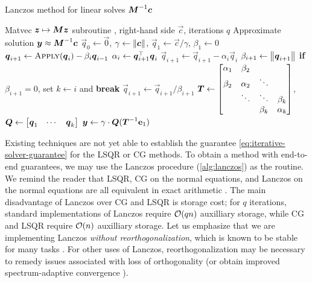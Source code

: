 \documentclass[onefignum,onetabnum,pagebackref,dvipsnames]{siamart220329}
\begin{document}
\begin{algorithm}[t]
	\caption{Lanczos method for linear solves $\mat{M}^{-1}\vec{c}$} \label{alg:lanczos}
	\begin{algorithmic}[1]
		\Require Matvec $\vec{z} \mapsto \mat{M}\vec{z}$ subroutine , right-hand side $\vec{c}$, iterations $q$
		\Ensure Approximate solution $\vec{y} \approx \mat{M}^{-1}\vec{c}$
		\State $\vec{q}_0 \gets \vec{0}$, $\gamma \gets \norm{\vec{c}}$, $\vec{q}_1\gets \vec{c}/\gamma$, $\beta_1 \gets 0$
        \State $\vec{q}_{i+1} \gets \Call{Apply}{\vec{q}_i} - \beta_i \vec{q}_{i-1}$
        \State $\alpha_i \gets \vec{q}_{i+1}^\top \vec{q}_i^{\vphantom{\top}}$
        \State $\vec{q}_{i+1} \gets \vec{q}_{i+1} - \alpha_i \vec{q}_i$
        \State $\beta_{i+1} \gets \norm{\vec{q}_{i+1}}$
        \State \textbf{if} $\beta_{i+1} = 0$, set $k\gets i$ and \textbf{break}
        \State $\vec{q}_{i+1} \gets \vec{q}_{i+1} / \beta_{i+1}$
        \EndFor
        \State $\mat{T} \gets \begin{bmatrix} \alpha_1 & \beta_2 \\ 
        \beta_2 & \alpha_2 & \ddots \\
        &\ddots & \ddots & \beta_k \\ && \beta_k & \alpha_k\end{bmatrix}$, $\mat{Q} \gets \begin{bmatrix} \vec{q}_1 & \cdots & \vec{q}_k \end{bmatrix}$
        \State $\vec{y} \gets \gamma \cdot \mat{Q} (\mat{T}^{-1}\mathbf{e}_1)$
	\end{algorithmic}
\end{algorithm}

Existing techniques are not yet able to establish the guarantee \cref{eq:iterative-solver-guarantee} for the LSQR or CG methods.
To obtain a method with end-to-end guarantees, we may use the Lanczos procedure (\cref{alg:lanczos}) as the  routine.
We remind the reader that LSQR, CG on the normal equations, and Lanczos on the normal equations are all equivalent in exact arithmetic \cite{Gre97a}.
The main disadvantage of Lanczos over CG and LSQR is storage cost; for $q$ iterations, standard implementations of Lanczos require $\order(qn)$ auxilliary storage, while CG and LSQR require $\order(n)$ auxilliary storage.
Let us emphasize that we are implementing Lanczos \emph{without reorthogonalization}, which is known to be stable for many tasks \cite[ch.~4]{Che24}.
For other uses of Lanczos, reorthogonalization may be necessary to remedy issues associated with loss of orthogonality (or obtain improved spectrum-adaptive convergence \cite[Fig.~5]{CHLZ25}).
\end{document}
